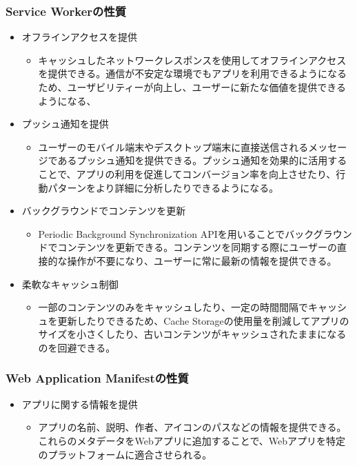 \subsubsection{Service Workerの性質}
\label{subsubsection:Service Workerの性質}
\begin{itemize}
    \item オフラインアクセスを提供
    \begin{itemize}
        \item キャッシュしたネットワークレスポンスを使用してオフラインアクセスを提供できる。通信が不安定な環境でもアプリを利用できるようになるため、ユーザビリティーが向上し、ユーザーに新たな価値を提供できるようになる、
    \end{itemize}
    \item プッシュ通知を提供
    \begin{itemize}
        \item ユーザーのモバイル端末やデスクトップ端末に直接送信されるメッセージであるプッシュ通知を提供できる。プッシュ通知を効果的に活用することで、アプリの利用を促進してコンバージョン率を向上させたり、行動パターンをより詳細に分析したりできるようになる。
    \end{itemize}
    \item バックグラウンドでコンテンツを更新
    \begin{itemize}
        \item Periodic Background Synchronization APIを用いることでバックグラウンドでコンテンツを更新できる。コンテンツを同期する際にユーザーの直接的な操作が不要になり、ユーザーに常に最新の情報を提供できる。
    \end{itemize}
    \item 柔軟なキャッシュ制御
    \begin{itemize}
        \item 一部のコンテンツのみをキャッシュしたり、一定の時間間隔でキャッシュを更新したりできるため、Cache Storageの使用量を削減してアプリのサイズを小さくしたり、古いコンテンツがキャッシュされたままになるのを回避できる。
    \end{itemize}
\end{itemize}
\subsubsection{Web Application Manifestの性質}\label{subsubsection:Web Application Manifestの性質}
\begin{itemize}
    \item アプリに関する情報を提供
    \begin{itemize}
        \item アプリの名前、説明、作者、アイコンのパスなどの情報を提供できる。これらのメタデータをWebアプリに追加することで、Webアプリを特定のプラットフォームに適合させられる。
    \end{itemize}
\end{itemize}
